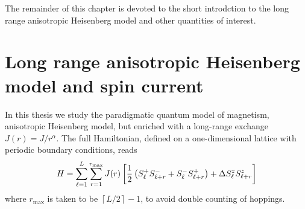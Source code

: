 The remainder of this chapter is devoted to the short introdction to the long range anisotropic Heisenberg model
and other quantities of interest.

\section{Long range anisotropic Heisenberg model and spin current}

In this thesis we study the paradigmatic quantum model of magnetism, anisotropic Heisenberg
model, but enriched with a long-range exchange \(J(r) = J/r^{\alpha}\). The full Hamiltonian, 
defined on a one-dimensional lattice with periodic boundary conditions, reads
\begin{equation}
    H = \sum_{\ell=1}^{L}\sum_{r=1}^{r_{\mathrm{max}}} J(r) \left[\frac{1}{2} \left(
        S^{+}_{\ell}S^{-}_{\ell+r} + S^{-}_{\ell}S^{+}_{\ell+r}\right) + \Delta S^{z}_{\ell}S^{z}_{\ell+r}
    \right]
    \label{eq:long_range}
\end{equation}
where \(r_{\mathrm{max}}\) is taken to be \(\left\lceil L/2\right\rceil - 1 \), to avoid double counting of hoppings.

